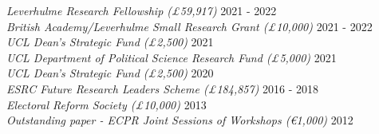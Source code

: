 \documentclass[centered]{res}
\begin{document}
\begin{resume}
 {
 {\sl Leverhulme Research Fellowship (\pounds 59,917)} \hfill 2021 - 2022 \\
{\sl British Academy/Leverhulme Small Research Grant  (\pounds 10,000)} \hfill 2021 - 2022 \\
{\sl UCL Dean's Strategic Fund (\pounds 2,500)} \hfill 2021 \\
{\sl UCL Department of Political Science Research Fund (\pounds 5,000)} \hfill 2021 \\
{\sl UCL Dean's Strategic Fund (\pounds 2,500)} \hfill 2020 \\
{\sl ESRC Future Research Leaders Scheme (\pounds 184,857)} \hfill 2016 - 2018 \\
{\sl Electoral Reform Society (\pounds 10,000)} \hfill 2013 \\
{\sl Outstanding paper - ECPR Joint Sessions of Workshops (\euro 1,000)} \hfill 2012 \\

}


\end{resume}
\end{document}
